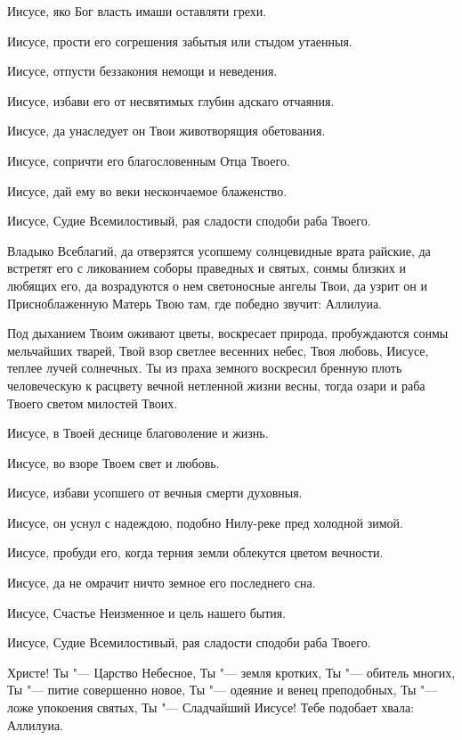 \begin{mymulticols}
Иисусе, яко Бог власть имаши оставляти грехи. 

Иисусе, прости его согрешения забытыя или стыдом утаенныя. 

Иисусе, отпусти беззакония немощи и неведения. 

Иисусе, избави его от несвятимых глубин адскаго отчаяния. 

Иисусе, да унаследует он Твои животворящия обетования. 

Иисусе, сопричти его благословенным Отца Твоего. 

Иисусе, дай ему во веки нескончаемое блаженство. 

Иисусе, Судие Всемилостивый, рая сладости сподоби раба Твоего.


Владыко Всеблагий, да отверзятся усопшему солнцевидные врата райские, да встретят его с ликованием соборы праведных и святых, сонмы близких и любящих его, да возрадуются о нем светоносные ангелы Твои, да узрит он и Присноблаженную Матерь Твою там, где победно звучит: Аллилуиа.


Под дыханием Твоим оживают цветы, воскресает природа, пробуждаются сонмы мельчайших тварей, Твой взор светлее весенних небес, Твоя любовь, Иисусе, теплее лучей солнечных. Ты из праха земного воскресил бренную плоть человеческую к расцвету вечной нетленной жизни весны, тогда озари и раба Твоего  светом милостей Твоих. 

Иисусе, в Твоей деснице благоволение и жизнь. 

Иисусе, во взоре Твоем свет и любовь. 

Иисусе, избави усопшего от вечныя смерти духовныя. 

Иисусе, он уснул с надеждою, подобно Нилу-реке пред холодной зимой. 

Иисусе, пробуди его, когда терния земли облекутся цветом вечности. 

Иисусе, да не омрачит ничто земное его последнего сна. 

Иисусе, Счастье Неизменное и цель нашего бытия. 

Иисусе, Судие Всемилостивый, рая сладости сподоби раба Твоего.


Христе! Ты "--- Царство Небесное, Ты "--- земля кротких, Ты "--- обитель многих, Ты "--- питие совершенно новое, Ты "--- одеяние и венец преподобных, Ты "--- ложе упокоения святых, Ты "--- Сладчайший Иисусе! Тебе подобает хвала: Аллилуиа.


\end{mymulticols}

